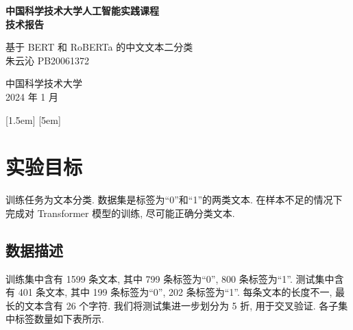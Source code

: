 \documentclass[12pt,a4paper]{article}
\begin{document}
{
\centering
\vspace*{3cm}
{\Huge\heiti\bfseries 中国科学技术大学人工智能实践课程\\技术报告\par}
\vspace{5cm}
{\Large 基于 BERT 和 RoBERTa 的中文文本二分类\\ 朱云沁 PB20061372\par}
\vfill
{\Large\fangsong 中国科学技术大学\\ 2024 年 1 月\par}
}
\newpage

[1.5em]{\vspace{0.5em}\fangsong}{\contentslabel{1.5em}}{}{\hspace{0.5em}\contentspage}
[5em]{\vspace{0.5em}\fangsong}{\contentslabel{2.5em}}{}{\hspace{0.5em}\contentspage}
\renewcommand{\contentsname}{\centering\heiti\bfseries 目录}
\tableofcontents
\newpage

\titleformat{\section}{\large\fangsong}{\thesection}{1em}{}
\titleformat{\subsection}{\fangsong}{\thesubsection}{1em}{}

\section{实验目标}

训练任务为文本分类. 数据集是标签为“0”和“1”的两类文本. 在样本不足的情况下完成对 Transformer 模型的训练, 尽可能正确分类文本.

\subsection{数据描述}

训练集中含有 1599 条文本, 其中 799 条标签为“0”, 800 条标签为“1”. 测试集中含有 401 条文本, 其中 199 条标签为“0”, 202 条标签为“1”. 每条文本的长度不一, 最长的文本含有 26 个字符. 我们将测试集进一步划分为 5 折, 用于交叉验证. 各子集中标签数量如下表所示.
\end{document}
